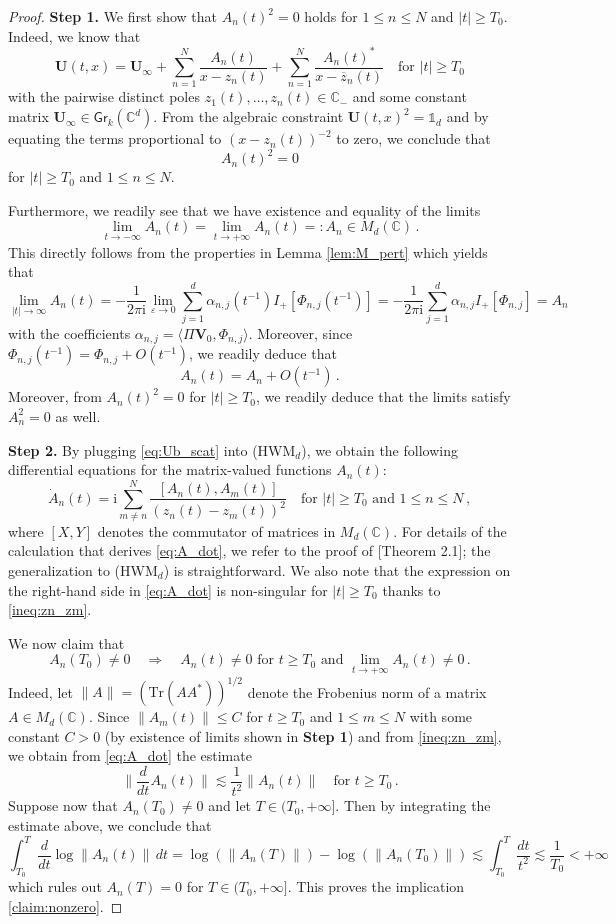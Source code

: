 \documentclass[11pt,reqno]{amsart}
\theoremstyle{definition}
\theoremstyle{remark}
\theoremstyle{remark}
\numberwithin{equation}{section}
\newcommand{\C}{\mathbb{C}}
\newcommand{\ov}{\overline}
\newcommand{\be}{\begin{equation}}
\newcommand{\ee}{\end{equation}}
\newcommand{\eps}{\varepsilon}
\newcommand{\ii}{\mathrm{i}}
\newcommand{\Vb}{\mathbf{V}}
\newcommand{\Ub}{\mathbf{U}}
\newcommand{\Tr}{\mathrm{Tr}}
\newcommand{\Gr}{\mathsf{Gr}}
\begin{document}
\begin{proof}
{\bf Step 1.} We first show that $A_n(t)^2 = 0$ holds for $1 \leq n \leq N$ and $|t| \geq T_0$. Indeed, we know that
\be \label{eq:Ub_scat}
\Ub(t,x) = \Ub_\infty + \sum_{n=1}^N \frac{A_n(t)}{x-z_n(t)} + \sum_{n=1}^N \frac{A_n(t)^*}{x-\ov{z}_n(t)} \quad \mbox{for $|t| \geq T_0$}
\ee
with the pairwise distinct poles $z_1(t), \ldots, z_n(t) \in \C_-$ and some constant matrix $\Ub_\infty \in \Gr_k(\C^d)$. From the algebraic constraint $\Ub(t,x)^2 = \mathds{1}_d$ and by equating the terms proportional to $(x-z_n(t))^{-2}$ to zero, we  conclude that
$$
A_n(t)^2 = 0 
$$
for $|t| \geq T_0$ and $1 \leq n \leq N$. 

Furthermore, we readily see that we have existence and equality of the limits
$$
\lim_{t \to -\infty} A_n(t) = \lim_{t \to +\infty} A_n(t) =: A_n \in M_d(\C) \, .
$$
This directly follows from the properties in Lemma \ref{lem:M_pert} which yields that
$$
\lim_{|t| \to \infty} A_n(t) = -\frac{1}{2 \pi \ii} \lim_{\eps \to 0} \sum_{j=1}^d \alpha_{n,j}(t^{-1}) I_+[\Phi_{n,j}(t^{-1})] = -\frac{1}{2 \pi \ii} \sum_{j=1}^d \alpha_{n,j} I_+[\Phi_{n,j}] = A_n
$$
with the coefficients $\alpha_{n,j} = \langle \Pi \Vb_0, \Phi_{n,j} \rangle$. Moreover, since $\Phi_{n,j}(t^{-1}) = \Phi_{n,j} + O(t^{-1})$, we readily deduce that
$$
A_n(t) = A_n + O(t^{-1}) \, .
$$
Moreover, from $A_n(t)^2 = 0$ for $|t| \geq T_0$, we readily deduce that the limits satisfy $A_n^2=0$ as well.

\medskip
{\bf Step 2.} By plugging \eqref{eq:Ub_scat} into (HWM$_d$), we obtain the following differential equations for the matrix-valued functions $A_n(t)$:
\be \label{eq:A_dot}
\dot{A}_n(t) = \ii \sum_{m \neq n}^N \frac{[A_n(t), A_m(t)]}{(z_n(t)-z_m(t))^2} \quad \mbox{for $|t| \geq T_0$ and $1 \leq n \leq N$} \, ,
\ee 
where $[X,Y]$ denotes the commutator of matrices in $M_d(\C)$. For details of the calculation that derives \eqref{eq:A_dot}, we refer to the proof of \cite{BeKlLa-20}[Theorem 2.1]; the generalization to (HWM$_d$) is straightforward. We also note that the expression on the right-hand side in \eqref{eq:A_dot} is non-singular for $|t| \geq T_0$ thanks to \eqref{ineq:zn_zm}. 


We now claim that
\be \label{claim:nonzero}
A_n(T_0) \neq 0 \quad \Rightarrow \quad \mbox{$A_n(t) \neq 0$ for $t \geq T_0$ and $\displaystyle \lim_{t \to +\infty} A_n(t) \neq 0$} \,.
\ee
Indeed, let $\| A \| = (\Tr(A A^*))^{1/2}$ denote the Frobenius norm of a matrix $A \in M_d(\C)$. Since $\| A_m(t) \| \leq C$ for $t \geq T_0$ and $1 \leq m \leq N$ with some constant $C>0$ (by existence of limits shown in \textbf{Step 1}) and from \eqref{ineq:zn_zm}, we obtain from \eqref{eq:A_dot} the estimate
\be
\| \frac{d}{dt}  A_n(t) \| \lesssim \frac{1}{t^2} \| A_n(t) \| \quad \mbox{for $t \geq T_0$} \, .
\ee
 Suppose now that $A_n(T_0) \neq 0$ and let $T \in (T_0,+\infty]$. Then by integrating the estimate above, we conclude that
 $$
 \int_{T_0}^T \frac{d}{dt} \log \|A_n(t)\| \, dt = \log(\| A_n(T) \| ) - \log(\| A_n(T_0) \|) \lesssim \int_{T_0}^T \frac{dt}{t^2}  \lesssim \frac{1}{T_0} < +\infty$$
 which rules out $A_n(T) = 0$ for $T \in (T_0, +\infty]$. This proves the implication \eqref{claim:nonzero}. 
 

\end{proof}
\end{document}
